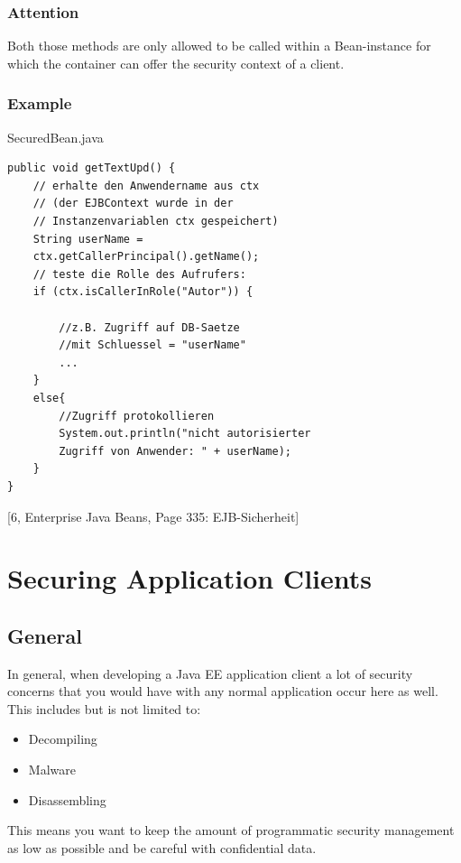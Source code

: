 \documentclass[12pt,a4paper]{report}
\begin{document}
\subsection{Attention}
Both those methods are only allowed to be called within a Bean-instance for which the container can offer the security context of a client.

\subsection{Example}
\begin{bclogo}[couleur=yellow!15,arrondi=0.1,logo=\bccrayon, ombre = true]{SecuredBean.java}
\begin{lstlisting}[style=Java]
public void getTextUpd() {
	// erhalte den Anwendername aus ctx
	// (der EJBContext wurde in der
	// Instanzenvariablen ctx gespeichert)
	String userName =
	ctx.getCallerPrincipal().getName();
	// teste die Rolle des Aufrufers:
	if (ctx.isCallerInRole("Autor")) {
		
		//z.B. Zugriff auf DB-Saetze
		//mit Schluessel = "userName"
		...
	}
	else{
		//Zugriff protokollieren
		System.out.println("nicht autorisierter
		Zugriff von Anwender: " + userName);
	}
}
\end{lstlisting}
\end{bclogo}

[6, Enterprise Java Beans, Page 335: EJB-Sicherheit]


\chapter{Securing Application Clients}
\section{General}
In general, when developing a Java EE application client a lot of security concerns that you would have with any normal application occur here as well.\\

This includes but is not limited to:
\begin{itemize}
\item Decompiling
\item Malware
\item Disassembling
\end{itemize}
This means you want to keep the amount of programmatic security management as low as possible and be careful with confidential data.\\\\
\end{document}
